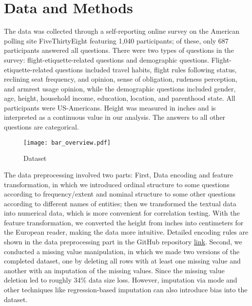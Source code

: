\documentclass{article}
\theoremstyle{plain}
\theoremstyle{definition}
\theoremstyle{remark}
\begin{document}
\section{Data and Methods}\label{sec:methods}

The data was collected through a self-reporting online survey on the American polling site FiveThirtyEight featuring 1,040 participants; of these, only 687 participants answered all questions. There were two types of questions in the survey: flight-etiquette-related questions and demographic questions. Flight-etiquette-related questions included travel habits, flight rules following status, reclining seat frequency, and opinion, sense of obligation, rudeness perception, and armrest usage opinion, while the demographic questions included gender, age, height, household income, education, location, and parenthood state. All participants were US-Americans. Height was measured in inches and is interpreted as a continuous value in our analysis. The answers to all other questions are categorical. 

\begin{figure*}[]
    \texttt{[image: bar\_overview.pdf]}
    \caption{Dataset}
    \label{bar_overview}
\end{figure*}

The data preprocessing involved two parts: First, Data encoding and feature transformation, in which we introduced ordinal structure to some questions according to frequency/extent and nominal structure to some other questions according to different names of entities; then we transformed the textual data into numerical data, which is more convenient for correlation testing. With the feature transformation, we converted the height from inches into centimeters for the European reader, making the data more intuitive. Detailed encoding rules are shown in the data preprocessing part in the GitHub repository \href{https://github.com/mloenker/flying-etiquette-data-lit}{link}. Second, we conducted a missing value manipulation, in which we made two versions of the completed dataset, one by deleting all rows with at least one missing value and another with an imputation of the missing values. Since the missing value deletion led to roughly 34\% data size loss. However, imputation via mode and other techniques like regression-based imputation can also introduce bias into the dataset.
\end{document}
